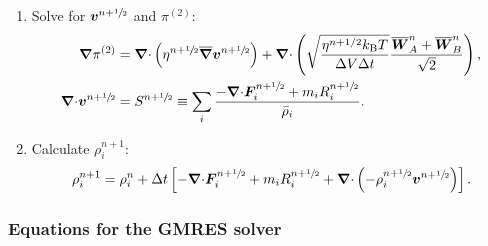 \documentclass[
10pt
showpacs, showkeys,
amsmath,amssymb,
aps,
pre,
floatfix,
]{revtex4-1}
\newcommand{\divg}{{\V\nabla\cdot}}                       %
\newcommand{\paren}[1]{{(#1)}}                            %
\begin{document}
\begin{enumerate}
\item Solve for $\boldsymbol{v}^{n+\sfrac{1}{2}}$ and $\pi^\paren{2}$:
\begin{align}
\label{overdamped_stokes_v_2nd}
\grad\pi^\paren{2} &= \divg\left( \eta^{n+\myhalf} \overline{\grad}\V{v}^{n+\myhalf} \right) 
+ \divg\left( \sqrt{\frac{\eta^{n+1/2} k_\mathrm{B}T}{\D{V}\D{t}} } \frac{\overline{\V{W}}^n_A + \overline{\V{W}}^n_B}{\sqrt{2}} \right),\\
\label{overdamped_stokes_p_2nd}
\divg\V{v}^{n+\myhalf} &= S^{n+\myhalf}\equiv \sum_i \frac{-\divg\V{F}^{n+\myhalf}_i + m_i R^{n+\myhalf}_i }{\bar{\rho}_i}.
\end{align}

\item Calculate $\rho^{n+1}_i$:
\begin{equation}
\rho^{n+1}_i = \rho^n_i + \D{t} \left[ -\divg\V{F}^{n+\myhalf}_i + m_i R^{n+\myhalf}_i + \divg\left( -\rho^{n+\myhalf}_i \V{v}^{n+\myhalf} \right) \right].
\end{equation} 

\end{enumerate}



\subsubsection{Equations for the GMRES solver}
\end{document}

